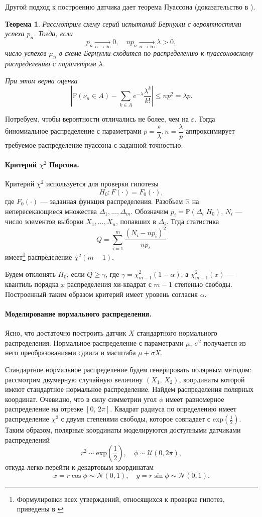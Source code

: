\documentclass[16pt]{article}
\newtheorem{Th}{Теорема}
\newcommand\Real{\mathbb{R}}
\newcommand\A{(\cdot)}
\newcommand\Sum[2]{\sum\limits_{#1}^{#2}}
\newcommand{\Prb}{\mathbb{P}}
\begin{document}
Другой подход к построению датчика дает теорема Пуассона (доказательство в \cite{Shir}).
\begin{Th}
Рассмотрим схему серий испытаний Бернулли с вероятностями успеха $p_n$. Тогда, если $$p_n \underset{n \to \infty}{\to} 0, \quad 
np_n \underset{n \to \infty}{\to} \lambda > 0,$$
число успехов $\mu_n$ в схеме Бернулли сходится по распределению к пуассоновскому распределению с параметром $\lambda$.

При этом верна оценка
$$\left|\mathbb{P}(\nu_n \in A) - \sum_{k \in A}e^{-\lambda}\dfrac{\lambda^k}{k!}\right| \leq np^2 = \lambda p.$$
\end{Th}

Потребуем, чтобы вероятности отличались не более, чем на $\varepsilon$. Тогда биномиальное распределение с параметрами $p = \dfrac{\varepsilon}{\lambda}, n = \dfrac{\lambda}{p}$ аппроксимирует требуемое распределение пуассона с заданной точностью.

\paragraph{Критерий $\chi^2$ Пирсона.} 
Критерий $\chi^2$ используется для проверки гипотезы
$$H_0\colon F\A = F_0\A,$$
где $F_0\A$ --- заданная функция распределения. Разобьем $\Real$ на непересекающиеся множества $\Delta_1, \ldots, \Delta_m$. Обозначим $p_i = \Prb(\Delta_i | H_0)$, $N_i$ --- число элементов выборки $X_1, \ldots, X_n$, попавших в $\Delta_i$. Тгда статистика 
$$Q = \Sum{i=1}{m}\dfrac{(N_i - np_i)^2}{np_i}$$
имеет\footnote{Формулировки всех утверждений, относящихся к проверке гипотез, приведены в \cite{DeGroot}} распределение $\chi^2(m - 1)$.

Будем отклонять $H_0$, если $Q \geq \gamma$, где $\gamma = \chi^2_{m-1}(1 - \alpha)$, а $\chi^2_{m-1}(x)$ --- квантиль порядка $x$ распределения хи-квадрат с $m - 1$ степенью свободы. Построенный таким образом критерий имеет уровень согласия $\alpha$.

\paragraph{Моделирование нормального распределения.}
Ясно, что достаточно построить датчик $X$ стандартного нормального распределения. Нормальное распределение с параметрами $\mu,\, \sigma^2$ получается из него преобразованиями сдвига и масштаба $\mu + \sigma X$.

Стандартное нормальное распределение будем генерировать полярным методом: рассмотрим двумерную случайную величину $(X_1,\, X_2)$, координаты которой имеют стандартное нормальное распределение. Найдем распределения полярных  координат. Очевидно, что в силу симметрии угол $\phi$ имеет равномерное распределение на отрезке $[0,\, 2\pi]$. Квадрат радиуса по определению имеет распределение $\chi^2$ с двумя степенями свободы, которое совпадает с $\mathrm{exp}\left(\frac12\right)$. Таким образом, полярные координаты моделируются доступными датчиками распределений
$$r^2 \sim \mathrm{exp}\left(\frac12\right), \quad \phi \sim \mathcal{U}(0, 2\pi),$$
откуда легко перейти к декартовым координатам
$$x = r \cos\phi \sim \mathcal{N}(0, 1), \quad y = r \sin \phi \sim \mathcal{N}(0, 1).$$
\end{document}
